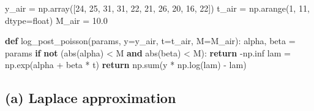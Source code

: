 \documentclass[
  letterpaper,
  DIV=11,
  numbers=noendperiod]{scrartcl}
\newenvironment{Shaded}{\begin{snugshade}}{\end{snugshade}}
\newcommand{\BuiltInTok}[1]{\textcolor[rgb]{0.00,0.23,0.31}{#1}}
\newcommand{\ControlFlowTok}[1]{\textcolor[rgb]{0.00,0.23,0.31}{\textbf{#1}}}
\newcommand{\DecValTok}[1]{\textcolor[rgb]{0.68,0.00,0.00}{#1}}
\newcommand{\FloatTok}[1]{\textcolor[rgb]{0.68,0.00,0.00}{#1}}
\newcommand{\KeywordTok}[1]{\textcolor[rgb]{0.00,0.23,0.31}{\textbf{#1}}}
\newcommand{\NormalTok}[1]{\textcolor[rgb]{0.00,0.23,0.31}{#1}}
\newcommand{\OperatorTok}[1]{\textcolor[rgb]{0.37,0.37,0.37}{#1}}
\begin{document}
\begin{Shaded}
\begin{Highlighting}[]
\NormalTok{y\_air }\OperatorTok{=}\NormalTok{ np.array([}\DecValTok{24}\NormalTok{, }\DecValTok{25}\NormalTok{, }\DecValTok{31}\NormalTok{, }\DecValTok{31}\NormalTok{, }\DecValTok{22}\NormalTok{, }\DecValTok{21}\NormalTok{, }\DecValTok{26}\NormalTok{, }\DecValTok{20}\NormalTok{, }\DecValTok{16}\NormalTok{, }\DecValTok{22}\NormalTok{])}
\NormalTok{t\_air }\OperatorTok{=}\NormalTok{ np.arange(}\DecValTok{1}\NormalTok{, }\DecValTok{11}\NormalTok{, dtype}\OperatorTok{=}\BuiltInTok{float}\NormalTok{)}
\NormalTok{M\_air }\OperatorTok{=} \FloatTok{10.0}

\KeywordTok{def}\NormalTok{ log\_post\_poisson(params, y}\OperatorTok{=}\NormalTok{y\_air, t}\OperatorTok{=}\NormalTok{t\_air, M}\OperatorTok{=}\NormalTok{M\_air):}
\NormalTok{    alpha, beta }\OperatorTok{=}\NormalTok{ params}
    \ControlFlowTok{if} \KeywordTok{not}\NormalTok{ (}\BuiltInTok{abs}\NormalTok{(alpha) }\OperatorTok{\textless{}}\NormalTok{ M }\KeywordTok{and} \BuiltInTok{abs}\NormalTok{(beta) }\OperatorTok{\textless{}}\NormalTok{ M):}
        \ControlFlowTok{return} \OperatorTok{{-}}\NormalTok{np.inf}
\NormalTok{    lam }\OperatorTok{=}\NormalTok{ np.exp(alpha }\OperatorTok{+}\NormalTok{ beta }\OperatorTok{*}\NormalTok{ t)}
    \ControlFlowTok{return}\NormalTok{ np.}\BuiltInTok{sum}\NormalTok{(y }\OperatorTok{*}\NormalTok{ np.log(lam) }\OperatorTok{{-}}\NormalTok{ lam)}
\end{Highlighting}
\end{Shaded}

\subsection{(a) Laplace approximation}\label{a-laplace-approximation-1}
\end{document}

